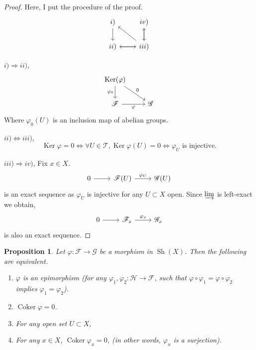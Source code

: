 \documentclass{article}
\newtheorem{proposition}{Proposition}[section]
\numberwithin{equation}{section}
\DeclareMathOperator{\Sh}{Sh}
\DeclareMathOperator{\Ker}{Ker}
\DeclareMathOperator{\Coker}{Coker}
\begin{document}
\begin{proof}
Here, I put the procedure of the proof.
\[
\begin{tikzcd}
i) \arrow[d]  & iv) \arrow[d]                       \\
ii) \arrow[r] & iii) \arrow[u] \arrow[l] \arrow[lu]
\end{tikzcd}
\]
\par $i)\Rightarrow ii)$, 
\[
\begin{tikzcd}
\Ker(\varphi) \arrow[d, "\varphi_0"'] \arrow[rd, "0"] &             \\
\mathcal{F} \arrow[r, "\varphi"']                     & \mathcal{G}
\end{tikzcd}
\]
Where $\varphi_0(U)$ is an inclusion map of abelian groups.\\
\par $ii)\Leftrightarrow iii)$,
\begin{equation*}
\Ker\varphi=0\Leftrightarrow \forall U\in\mathcal{T}, \Ker\varphi(U)=0\Leftrightarrow\varphi_U\text{ is injective.}
\end{equation*}
\par $iii)\Rightarrow iv)$,
Fix $x\in X$.
\[
\begin{tikzcd}
0 \arrow[r] & \mathcal{F}(U) \arrow[r, "\varphi_U"] & \mathcal{G}(U)
\end{tikzcd}
\]
is an exact sequence as $\varphi_U$ is injective for any $U\subset X$ open. Since $\varinjlim$ is left-exact we obtain,
\[
\begin{tikzcd}
0 \arrow[r] & \mathcal{F}_x \arrow[r, "\varphi_x"] & \mathcal{G}_x
\end{tikzcd}
\]
is also an exact sequence.
\end{proof}

\begin{proposition}
Let $\varphi:\mathcal{F}\to\mathcal{G}$ be a morphism in $\Sh(X)$. Then the following are equivalent.
\begin{enumerate}[1).]
\item $\varphi$ is an epimorphism (for any $\varphi_1,\varphi_2:\mathcal{H}\to\mathcal{F}$, such that $\varphi\circ\varphi_1=\varphi\circ\varphi_2$ implies $\varphi_1=\varphi_2$).
\item $\Coker\varphi=0$.
\item For any open set $U\subset X$, 
\item  For any $x\in X$, $\Coker\varphi_x = 0$, (in other words, $\varphi_x$ is a surjection).
\end{enumerate}
\end{proposition}
\end{document}
